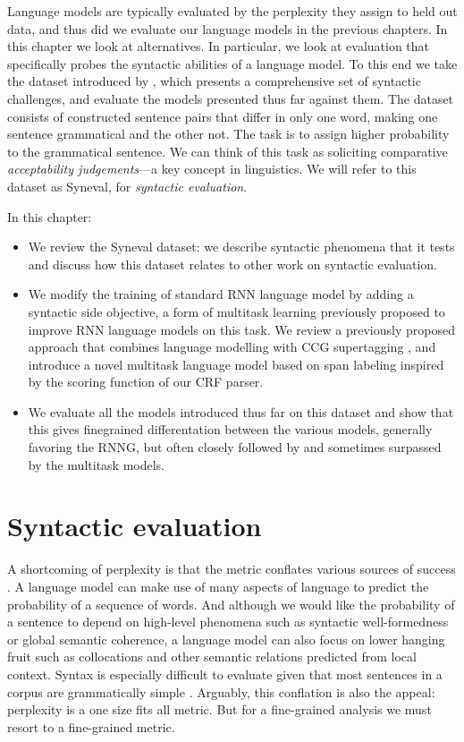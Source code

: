 Language models are typically evaluated by the perplexity they assign to held out data, and thus did we evaluate our language models in the previous chapters. In this chapter we look at alternatives. In particular, we look at evaluation that specifically probes the syntactic abilities of a language model. To this end we take the dataset introduced by \citet{linzen2018targeted}, which presents a comprehensive set of syntactic challenges, and evaluate the models presented thus far against them. The dataset consists of constructed sentence pairs that differ in only one word, making one sentence grammatical and the other not. The task is to assign higher probability to the grammatical sentence. We can think of this task as soliciting comparative \textit{acceptability judgements}---a key concept in linguistics. We will refer to this dataset as Syneval, for \textit{syntactic evaluation}.

In this chapter:
\begin{itemize}
  \item We review the Syneval dataset: we describe syntactic phenomena that it tests and discuss how this dataset relates to other work on syntactic evaluation.
  \item We modify the training of standard RNN language model by adding a syntactic side objective, a form of multitask learning previously proposed to improve RNN language models on this task. We review a previously proposed approach that combines language modelling with CCG supertagging \citep{enguehard2017multitask}, and introduce a novel multitask language model based on span labeling inspired by the scoring function of our CRF parser.
  \item We evaluate all the models introduced thus far on this dataset and show that this gives finegrained differentation between the various models, generally favoring the RNNG, but often closely followed by and sometimes surpassed by the multitask models.
\end{itemize}

\section{Syntactic evaluation}
  A shortcoming of perplexity is that the metric conflates various sources of success \citep{linzen2018targeted}. A language model can make use of many aspects of language to predict the probability of a sequence of words. And although we would like the probability of a sentence to depend on high-level phenomena such as syntactic well-formedness or global semantic coherence, a language model can also focus on lower hanging fruit such as collocations and other semantic relations predicted from local context. Syntax is especially difficult to evaluate given that most sentences in a corpus are grammatically simple \citep{linzen2018targeted}. Arguably, this conflation is also the appeal: perplexity is a one size fits all metric. But for a fine-grained analysis we must resort to a fine-grained metric.

